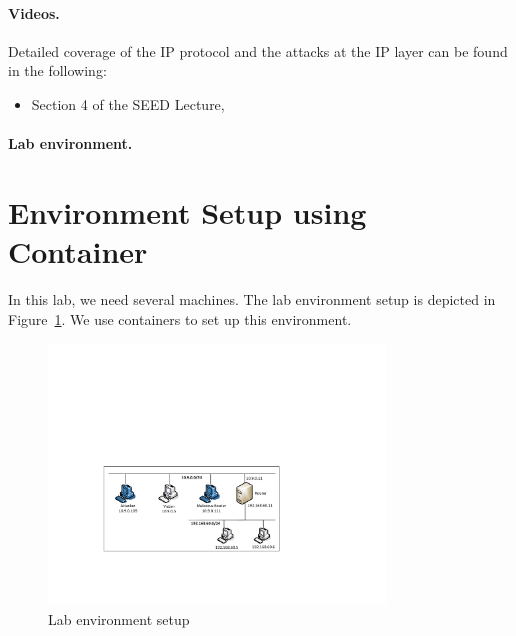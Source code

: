\paragraph{Videos.}
Detailed coverage of the IP protocol and the attacks at the IP layer can be found 
in the following:

\begin{itemize}
\item Section 4 of the SEED Lecture, \seedisvideo
\end{itemize}


\paragraph{Lab environment.} \seedenvironmentC



\section{Environment Setup using Container}

In this lab, we need several machines. The lab
environment setup is depicted in Figure~\ref{ip:fig:labsetup}.
We use containers to set up this environment.


\begin{figure}[htb]
\begin{center}
\includegraphics[width=0.8\textwidth]{./Figs/TwoLANs_ICMP.pdf}
\end{center}
\caption{Lab environment setup}
\label{ip:fig:labsetup}
\end{figure}



